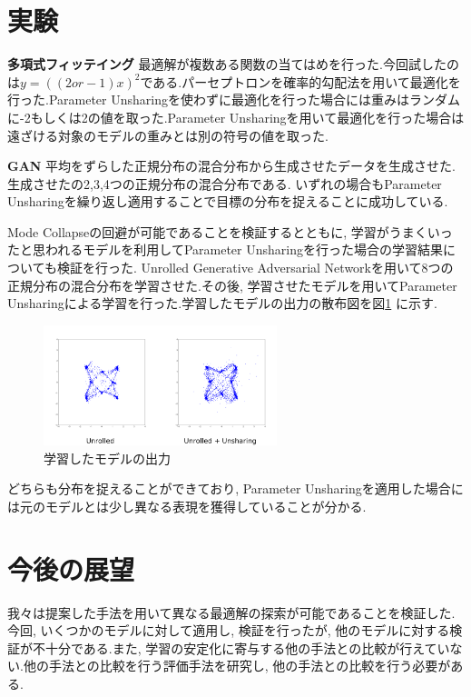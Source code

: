 \documentclass[techrep, submit, noauthor,preface]{ipsj}
\begin{document}
\section{実験}

{\bf 多項式フィッテイング} 最適解が複数ある関数の当てはめを行った.今回試したのは$y = ((2or-1)x)^2$である.パーセプトロンを確率的勾配法を用いて最適化を行った.Parameter Unsharingを使わずに最適化を行った場合には重みはランダムに-2もしくは2の値を取った.Parameter Unsharingを用いて最適化を行った場合は遠ざける対象のモデルの重みとは別の符号の値を取った.

{\bf GAN} 平均をずらした正規分布の混合分布から生成させたデータを生成させた. 生成させたの2,3,4つの正規分布の混合分布である.
いずれの場合もParameter Unsharingを繰り返し適用することで目標の分布を捉えることに成功している.

Mode Collapseの回避が可能であることを検証するとともに,
学習がうまくいったと思われるモデルを利用してParameter Unsharingを行った場合の学習結果についても検証を行った.
Unrolled Generative Adversarial Networkを用いて8つの正規分布の混合分布を学習させた.その後, 
学習させたモデルを用いてParameter Unsharingによる学習を行った.学習したモデルの出力の散布図を図\ref{fig:unrolled}
に示す.

\begin{figure}[htb]
  \begin{center}
    \includegraphics[height=3.5cm]{unrolled.png}
  \end{center}
  \caption{学習したモデルの出力}
  \label{fig:unrolled}
\end{figure}

どちらも分布を捉えることができており, Parameter Unsharingを適用した場合には元のモデルとは少し異なる表現を獲得していることが分かる.



\section{今後の展望}

我々は提案した手法を用いて異なる最適解の探索が可能であることを検証した.今回, いくつかのモデルに対して適用し, 検証を行ったが, 他のモデルに対する検証が不十分である.また, 学習の安定化に寄与する他の手法との比較が行えていない.他の手法との比較を行う評価手法を研究し, 他の手法との比較を行う必要がある.



\end{document}
